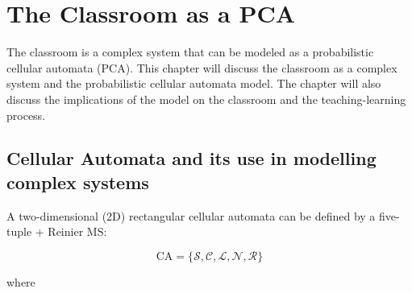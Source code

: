 \chapter{The Classroom as a PCA}
\hspace{\parindent} The classroom is a complex system that can be modeled as a probabilistic cellular automata (PCA). 
This chapter will discuss the classroom as a complex system and the probabilistic cellular automata model. 
The chapter will also discuss the implications of the model on the classroom and the teaching-learning process.

\section{Cellular Automata and its use in modelling complex systems}

A two-dimensional (2D) rectangular cellular automata can be defined by a five-tuple \cite{arciaga2009experimental} + Reinier MS:

\begin{equation}
    \label{eq:CA definition}
    \text{CA} = \lbrace \mathcal{S,C,L,N,R} \rbrace
\end{equation}

where
\newcommand\itemS{\item[$\mathcal{S}=$]}
\newcommand\itemC{\item[$\mathcal{C}=$]}
\newcommand\itemL{\item[$\mathcal{L}=$]}
\newcommand\itemN{\item[$\mathcal{N}=$]}
\newcommand\itemR{\item[$\mathcal{R}=$]}

